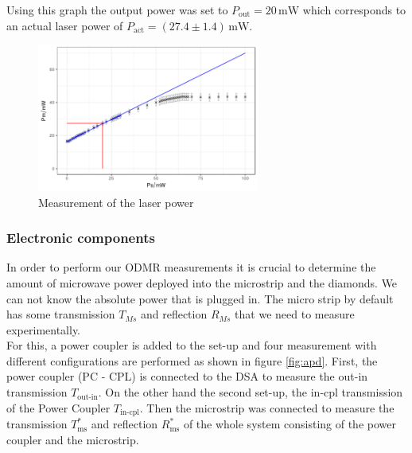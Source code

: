 Using this graph the output power was set to $P_\text{out}=20\,\mathrm{mW}$ which corresponds to an actual laser power of $P_\text{act}=(27.4\pm1.4)\,\mathrm{mW}$.
\begin{figure}
	\centering
	\includegraphics[width=0.65\textwidth]{../figures/powercal.png}
	\caption{Measurement of the laser power}
	\label{fig:power}
\end{figure}


\subsubsection{Electronic components} \label{elctr}


In order to perform our ODMR measurements it is crucial to determine the amount of microwave power deployed into the microstrip and the diamonds. We can not know the absolute power that is plugged in. The micro strip by default has some transmission $T_{Ms}$ and reflection $R_{Ms}$ that we need to measure experimentally.\\

For this, a power coupler is added to the set-up and four measurement with different configurations are performed as shown in figure \ref{fig:apd}. First, the power coupler (PC - CPL) is connected to the DSA to measure the out-in transmission $T_\text{out-in}$. On the other hand the second set-up, the in-cpl transmission of the Power Coupler $T_\text{in-cpl}$. Then the microstrip was connected to measure the transmission $T_\text{ms}^*$ and reflection $R_\text{ms}^*$ of the whole system consisting of the power coupler and the microstrip.


